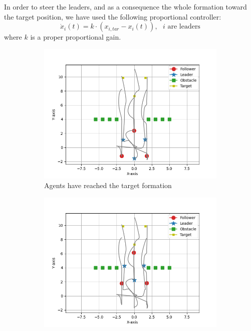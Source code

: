 \documentclass[a4paper,11pt,oneside]{book}
\begin{document}
\bigskip
In order to steer the leaders, and as a consequence the whole formation toward the target position, we have used the following proportional controller:
\begin{equation}
\dot{x}_i(t) = k\cdot (x_{i,tar} - x_i(t)), \text{     $i$ are leaders}
\end{equation}
where $k$ is a proper proportional gain.

\begin{figure}[h]
\centering
	\begin{subfigure}{0.5\textwidth}	
	\includegraphics[width=\textwidth]{Hexagon_obstacle_Initial.jpg}
	\caption{Agents have reached the target formation}
	\end{subfigure}
\vfill
	\begin{subfigure}{0.5\textwidth}	
	\includegraphics[width=\textwidth]{Hexagon_obstacle.jpg}

\end{subfigure}
\end{figure}
\end{document}
